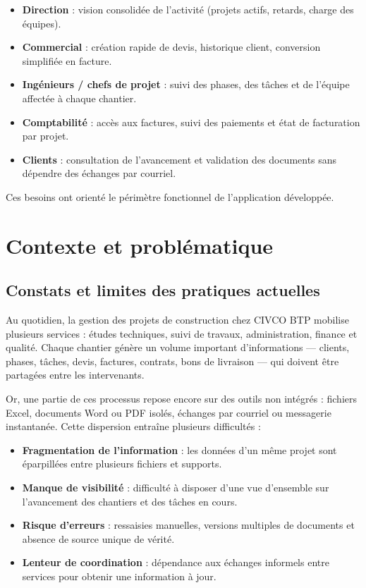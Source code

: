 \begin{itemize}
  \item \textbf{Direction} : vision consolidée de l'activité (projets actifs,
  retards, charge des équipes).
  \item \textbf{Commercial} : création rapide de devis, historique client,
  conversion simplifiée en facture.
  \item \textbf{Ingénieurs / chefs de projet} : suivi des phases, des tâches et
  de l'équipe affectée à chaque chantier.
  \item \textbf{Comptabilité} : accès aux factures, suivi des paiements et état
  de facturation par projet.
  \item \textbf{Clients} : consultation de l'avancement et validation des
  documents sans dépendre des échanges par courriel.
\end{itemize}

Ces besoins ont orienté le périmètre fonctionnel de l'application développée.

\section{Contexte et problématique}

\subsection{Constats et limites des pratiques actuelles}

Au quotidien, la gestion des projets de construction chez CIVCO BTP mobilise plusieurs
services : études techniques, suivi de travaux, administration, finance et qualité.
Chaque chantier génère un volume important d'informations --- clients, phases, tâches,
devis, factures, contrats, bons de livraison --- qui doivent être partagées entre les
intervenants.

Or, une partie de ces processus repose encore sur des outils non intégrés : fichiers
Excel, documents Word ou PDF isolés, échanges par courriel ou messagerie instantanée.
Cette dispersion entraîne plusieurs difficultés :

\begin{itemize}
  \item \textbf{Fragmentation de l'information} : les données d'un même projet sont
  éparpillées entre plusieurs fichiers et supports.
  \item \textbf{Manque de visibilité} : difficulté à disposer d'une vue d'ensemble sur
  l'avancement des chantiers et des tâches en cours.
  \item \textbf{Risque d'erreurs} : ressaisies manuelles, versions multiples de documents
  et absence de source unique de vérité.
  \item \textbf{Lenteur de coordination} : dépendance aux échanges informels entre
  services pour obtenir une information à jour.
\end{itemize}

